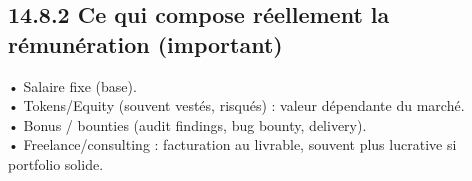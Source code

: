\documentclass[12pt,landscape,a4paper]{article}
\begin{document}
\subsection{14.8.2 Ce qui compose réellement la rémunération (important)}
• Salaire fixe (base).\\
\vspace{0.5em}
• Tokens/Equity (souvent vestés, risqués) : valeur dépendante du marché.\\
\vspace{0.5em}
• Bonus / bounties (audit findings, bug bounty, delivery).\\
\vspace{0.5em}
• Freelance/consulting : facturation au livrable, souvent plus lucrative si portfolio solide.\\
\vspace{0.5em}
\vspace{0.5em}
\end{document}
